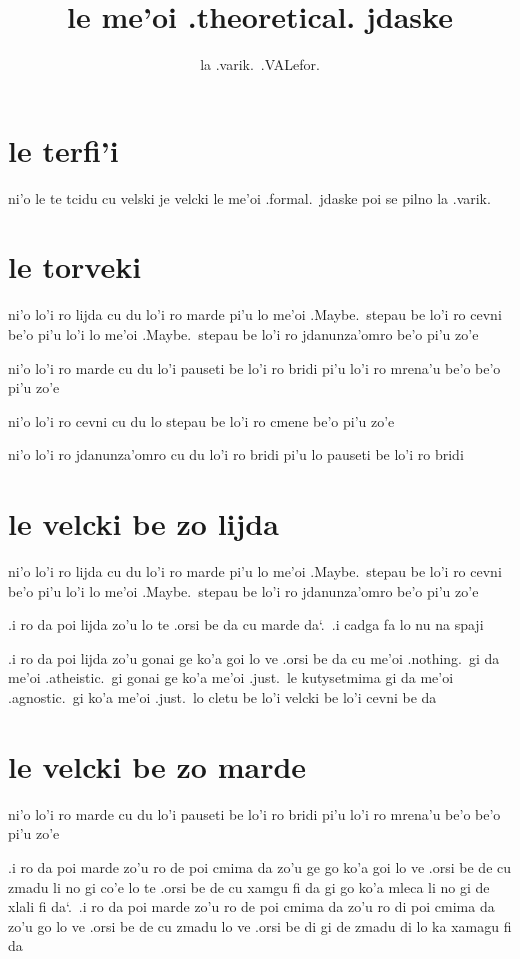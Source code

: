 \documentclass{report}
\title{le me'oi .theoretical. jdaske}
\author{la .varik.\ .VALefor.}
\newcommand\sds{\spacefactor\sfcode`.\ \space}
\newcommand\lijdyvelcki{lo'i ro lijda cu du lo'i ro marde pi'u lo me'oi .Maybe.\ stepau be lo'i ro cevni be'o pi'u lo'i lo me'oi .Maybe.\ stepau be lo'i ro jdanunza'omro be'o pi'u zo'e}
\newcommand\mardyvelcki{lo'i ro marde cu du lo'i pauseti be lo'i ro bridi pi'u lo'i ro mrena'u be'o be'o pi'u zo'e}
\newcommand\cevnyvelcki{lo'i ro cevni cu du lo stepau be lo'i ro cmene be'o pi'u zo'e}
\newcommand\jdanunzahomrovelcki{lo'i ro jdanunza'omro cu du lo'i ro bridi pi'u lo pauseti be lo'i ro bridi}
\begin{document}
\maketitle{}
\tableofcontents{}
\chapter{le terfi'i}
ni'o le te tcidu cu velski je velcki le me'oi .formal.\ jdaske poi se pilno la .varik.

\chapter{le torveki}
ni'o \lijdyvelcki

ni'o \mardyvelcki

ni'o \cevnyvelcki

ni'o \jdanunzahomrovelcki

\chapter{le velcki be zo lijda}
ni'o \lijdyvelcki

.i ro da poi lijda zo'u lo te .orsi be da cu marde da\sds  .i cadga fa lo nu na spaji

.i ro da poi lijda zo'u gonai ge ko'a goi lo ve .orsi be da cu me'oi .nothing.\ gi da me'oi .atheistic.\ gi gonai ge ko'a me'oi .just.\ le kutysetmima gi da me'oi .agnostic.\ gi ko'a me'oi .just.\ lo cletu be lo'i velcki be lo'i cevni be da

\chapter{le velcki be zo marde}
ni'o \mardyvelcki

.i ro da poi marde zo'u ro de poi cmima da zo'u ge go ko'a goi lo ve .orsi be de cu zmadu li no gi co'e lo te .orsi be de cu xamgu fi da gi go ko'a mleca li no gi de xlali fi da\sds .i ro da poi marde zo'u ro de poi cmima da zo'u ro di poi cmima da zo'u go lo ve .orsi be de cu zmadu lo ve .orsi be di gi de zmadu di lo ka xamagu fi da
\end{document}
